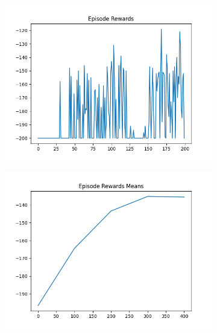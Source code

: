 \begin{figure}[H]
\begin{subfigure}{.47\linewidth}
        \includegraphics[width=\textwidth]{mountain/2024-06-15_13-45-47_dqn_mountaincar_episode_rewards.png}
    \end{subfigure}
    \begin{subfigure}{.47\linewidth}
        \centering
        \includegraphics[width=\textwidth]{mountain/2024-06-15_13-20-27_dqn_mountaincar_episode_rewards_means.png}
    \end{subfigure}
\end{figure}
